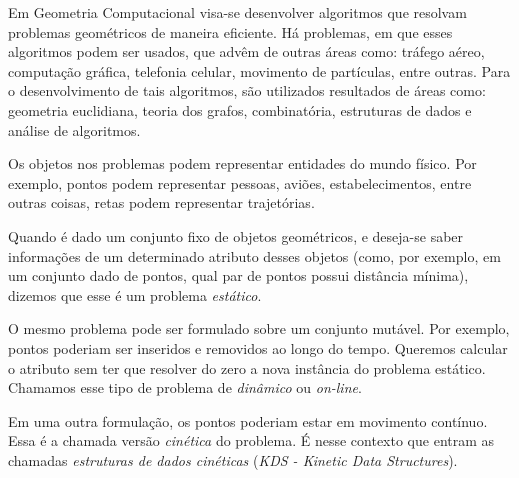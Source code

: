 

\label{cap:introducao}

\enlargethispage{.5\baselineskip}

Em Geometria Computacional visa-se desenvolver algoritmos que
resolvam problemas geométricos de maneira eficiente. Há problemas,
em que esses algoritmos podem ser usados, que advêm de outras áreas
como: tráfego aéreo, computação gráfica, telefonia celular,
movimento de partículas, entre outras. Para o desenvolvimento de
tais algoritmos, são utilizados resultados de áreas como: geometria
euclidiana, teoria dos grafos, combinatória, estruturas de dados e
análise de algoritmos.

Os objetos nos problemas podem representar entidades do mundo
físico. Por exemplo, pontos podem representar pessoas, aviões,
estabelecimentos, entre outras coisas, retas podem representar
trajetórias.

Quando é dado um conjunto fixo de objetos geométricos, e deseja-se
saber informações de um determinado atributo desses objetos (como,
por exemplo, em um conjunto dado de pontos, qual par de pontos
possui distância mínima), dizemos que esse é um problema
\textit{estático}.

O mesmo problema pode ser formulado sobre um conjunto mutável. Por
exemplo, pontos poderiam ser inseridos e removidos ao longo do
tempo. Queremos calcular o atributo sem ter que resolver do zero a
nova instância do problema estático. Chamamos esse tipo de problema
de \textit{dinâmico} ou \textit{on-line}.

Em uma outra formulação, os pontos poderiam estar em movimento
contínuo. Essa é a chamada versão \textit{cinética} do problema. É
nesse contexto que entram as chamadas \textit{estruturas de dados
cinéticas} (\emph{KDS - Kinetic Data Structures}).

